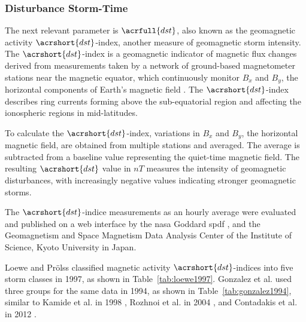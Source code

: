 \documentclass[sn-mathphys-num]{sn-jnl}%
\begin{document}
\subsubsection{Disturbance Storm-Time}

The next relevant parameter is $\acrfull{dst}$, also known as the geomagnetic activity $\acrshort{dst}$-index, another measure of geomagnetic storm intensity. The $\acrshort{dst}$-index is a geomagnetic indicator of magnetic flux changes derived from measurements taken by a network of ground-based magnetometer stations near the magnetic equator, which continuously monitor $B_{x}$ and $B_{y}$, the horizontal components of Earth's magnetic field \cite{zolesi2014ionospheric}. The $\acrshort{dst}$-index describes ring currents forming above the sub-equatorial region and affecting the ionospheric regions in mid-latitudes.

To calculate the $\acrshort{dst}$-index, variations in $B_{x}$ and $B_{y}$, the horizontal magnetic field, are obtained from multiple stations and averaged. The average is subtracted from a baseline value representing the quiet-time magnetic field. The resulting $\acrshort{dst}$ value in $nT$ measures the intensity of geomagnetic disturbances, with increasingly negative values indicating stronger geomagnetic storms. 

The $\acrshort{dst}$-indice measurements as an hourly average were evaluated and published on a web interface by the \acrshort{nasa} Goddard \acrshort{spdf} \cite{Papitashvili2024About, Papitashvili2024Explorer}, and the Geomagnetism and Space Magnetism Data Analysis Center of the Institute of Science, Kyoto University in Japan.

Loewe and Prölss \cite{loewe1997classification} classified magnetic activity $\acrshort{dst}$-indices into five storm classes in 1997, as shown in Table~\ref{tab:loewe1997}. Gonzalez et al. \cite{gonzalez1994geomagnetic} used three groups for the same data in 1994, as shown in Table~\ref{tab:gonzalez1994}, similar to Kamide et al. in 1998 \cite{kamide1998two}, Rozhnoi et al. in 2004 \cite{rozhnoi2004middle}, and Contadakis et al. in 2012 \cite{contadakis2012total}.
\end{document}
